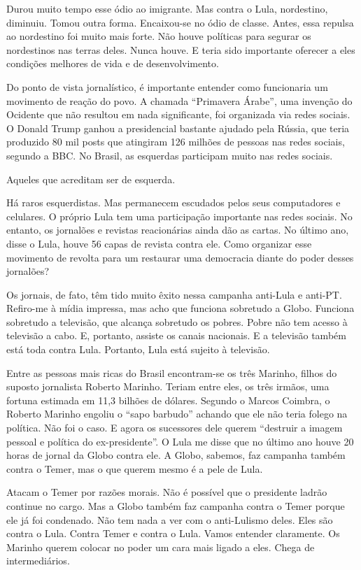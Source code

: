  Durou muito tempo esse ódio ao imigrante. Mas contra o Lula,
nordestino, diminuiu. Tomou outra forma. Encaixou-se no ódio de classe.
Antes, essa repulsa ao nordestino foi muito mais forte. Não houve
políticas para segurar os nordestinos nas terras deles. Nunca houve. E
teria sido importante oferecer a eles condições melhores de vida e de
desenvolvimento.

 Do ponto de vista jornalístico, é importante entender como
funcionaria um movimento de reação do povo. A chamada ``Primavera
Árabe'', uma invenção do Ocidente que não resultou em nada significante,
foi organizada via redes sociais. O Donald Trump ganhou a presidencial
bastante ajudado pela Rússia, que teria produzido 80 mil posts que
atingiram 126 milhões de pessoas nas redes sociais, segundo a BBC. No
Brasil, as esquerdas participam muito nas redes sociais.

 Aqueles que acreditam ser de esquerda.

 Há raros esquerdistas. Mas permanecem escudados pelos seus
computadores e celulares. O próprio Lula tem uma participação importante
nas redes sociais. No entanto, os jornalões e revistas reacionárias
ainda dão as cartas. No último ano, disse o Lula, houve 56 capas de
revista contra ele. Como organizar esse movimento de revolta para um
restaurar uma democracia diante do poder desses jornalões?

 Os jornais, de fato, têm tido muito êxito nessa campanha anti-Lula e
anti-PT. Refiro-me à mídia impressa, mas acho que funciona sobretudo a
Globo. Funciona sobretudo a televisão, que alcança sobretudo os pobres.
Pobre não tem acesso à televisão a cabo. E, portanto, assiste os canais
nacionais. E a televisão também está toda contra Lula. Portanto, Lula
está sujeito à televisão.

 Entre as pessoas mais ricas do Brasil encontram-se os três Marinho,
filhos do suposto jornalista Roberto Marinho. Teriam entre eles, os três
irmãos, uma fortuna estimada em 11,3 bilhões de dólares. Segundo o
Marcos Coimbra, o Roberto Marinho engoliu o ``sapo barbudo'' achando que
ele não teria folego na política. Não foi o caso. E agora os sucessores
dele querem ``destruir a imagem pessoal e política do ex-presidente''. O
Lula me disse que no último ano houve 20 horas de jornal da Globo contra
ele. A Globo, sabemos, faz campanha também contra o Temer, mas o que
querem mesmo é a pele de Lula.

 Atacam o Temer por razões morais. Não é possível que o presidente
ladrão continue no cargo. Mas a Globo também faz campanha contra o Temer
porque ele já foi condenado. Não tem nada a ver com o anti-Lulismo
deles. Eles são contra o Lula. Contra Temer e contra o Lula. Vamos
entender claramente. Os Marinho querem colocar no poder um cara mais
ligado a eles. Chega de intermediários.

